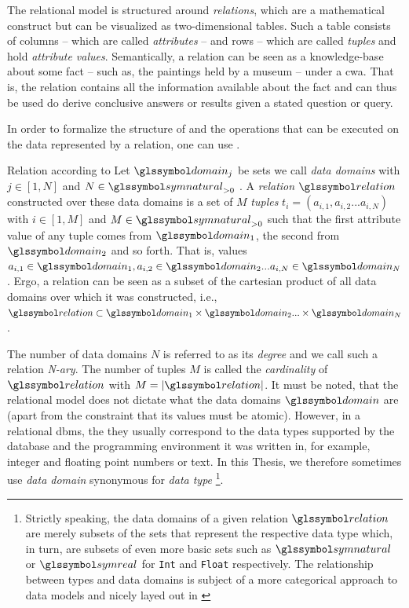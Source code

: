 The relational model is structured around \emph{relations}, which are a mathematical construct but can be visualized as two-dimensional tables. Such a table consists of columns -- which are called \emph{attributes} -- and rows -- which are called \emph{tuples} and hold \emph{attribute values}. Semantically, a relation can be seen as a knowledge-base about some fact -- such as, the paintings held by a museum -- under a \gls{cwa}{}. That is, the relation contains all the information available about the fact and can thus be used do derive conclusive answers or results given a stated question or query.

In order to formalize the structure of and the operations that can be executed on the data represented by a relation, one can use . 

\begin{definition}[label=definition:relation]{Relation according to \cite{Codd:1970Relational}}{}
    Let $\domain_j$ be sets we call \emph{data domains} with $j \in \left[ 1, N \right]$ and $N \in \symnatural_{> 0}$ . A \emph{relation} $\relation$ constructed over these data domains is a set of $M$ \emph{tuples} $t_i = (a_{i,1}, a_{i,2} ... a_{i,N})$ with $i \in \left[ 1, M \right]$ and $M \in \symnatural_{> 0}$ such that the first attribute value of any tuple comes from $\domain_1$, the second from $\domain_2$ and so forth. That is, values $a_{i,1} \in \domain_1, a_{i,2} \in \domain_2 ... a_{i,N} \in \domain_N$. Ergo, a relation can be seen as a subset of the cartesian product of all data domains over which it was constructed, i.e., $\relation \subset \domain_1 \times \domain_2 ... \times \domain_N$.
\end{definition}

The number of data domains $N$ is referred to as its \emph{degree} and we call such a relation \emph{N-ary}. The number of tuples $M$ is called the \emph{cardinality} of $\relation$ with $M = |\relation|$. It must be noted, that the relational model does not dictate what the data domains $\domain$ are (apart from the constraint that its values must be atomic). However, in a relational \acrshort{dbms}, the they usually correspond to the data types supported by the database and the programming environment it was written in, for example, integer and floating point numbers or text. In this Thesis, we therefore sometimes use \emph{data domain} synonymous for \emph{data type} \footnote{Strictly speaking, the data domains of a given relation $\relation$ are merely subsets of the sets that represent the respective data type which, in turn, are subsets of even more basic sets such as $\symnatural$ or $\symreal$ for \lstinline{Int} and \lstinline{Float} respectively. The relationship between types and data domains is subject of a more categorical approach to data models and nicely layed out in \cite{Spivak:2009Simplicial}}.

